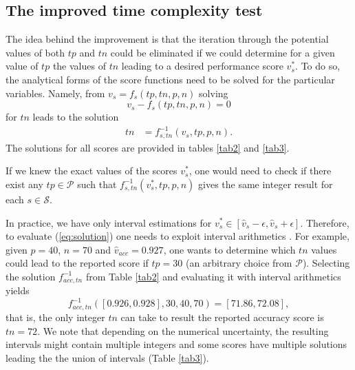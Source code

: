 \documentclass[5p, final]{elsarticle}
\begin{document}
\subsection{The improved time complexity test}
\label{sec:improved}

The idea behind the improvement is that the iteration through the potential values of both $tp$ and $tn$ could be eliminated if we could determine for a given value of $tp$ the values of $tn$ leading to a desired performance score $v_s^{*}$. To do so, the analytical forms of the score functions need to be solved for the particular variables. Namely, from $v_s = f_s(tp, tn, p, n)$ solving
\begin{equation}
v_s - f_s(tp, tn, p, n) = 0
\end{equation}
for $tn$ leads to the solution
\begin{align}
\label{eq:solution}
tn &= f_{s, tn}^{-1}(v_s, tp, p, n).
\end{align}
The solutions for all scores are provided in tables \ref{tab2} and \ref{tab3}.

If we knew the exact values of the scores $v_s^*$, one would need to check if there exist any $tp\in\mathcal{P}$ such that \break $f_{s, tn}^{-1}(v_s^*, tp, p, n)$ gives the same integer result for each $s\in\mathcal{S}$.

In practice, we have only interval estimations for $v_s^* \in [\hat{v}_s - \epsilon, \hat{v}_s + \epsilon]$. Therefore, to evaluate (\ref{eq:solution}) one needs to exploit interval arithmetics \cite{interval}. For example, given $p=40$, $n=70$ and $\hat{v}_{acc} = 0.927$, one wants to determine which $tn$ values could lead to the reported score if $tp=30$ (an arbitrary choice from $\mathcal{P}$). Selecting the solution $f^{-1}_{acc, tn}$ from Table \ref{tab2} and evaluating it with interval arithmetics yields
\begin{equation}
f^{-1}_{acc, tn}([0.926, 0.928], 30, 40, 70) = [71.86, 72.08],
\end{equation}
that is, the only integer $tn$ can take to result the reported accuracy score is $tn=72$. We note that depending on the numerical uncertainty, the resulting intervals might contain multiple integers and some scores have multiple solutions leading the the union of intervals (Table \ref{tab3}).
\end{document}
